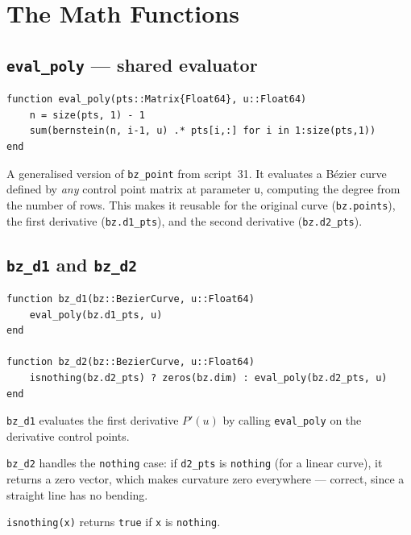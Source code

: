 \documentclass[12pt, a4paper]{article}
\newcommand{\cd}[1]{\texttt{#1}}
\begin{document}
\section{The Math Functions}

\subsection{\texttt{eval\_poly} --- shared evaluator}

\begin{verbatim}
function eval_poly(pts::Matrix{Float64}, u::Float64)
    n = size(pts, 1) - 1
    sum(bernstein(n, i-1, u) .* pts[i,:] for i in 1:size(pts,1))
end
\end{verbatim}

A generalised version of \cd{bz\_point} from script~31.
It evaluates a B\'ezier curve defined by \emph{any}
control point matrix at parameter \cd{u}, computing
the degree from the number of rows.
This makes it reusable for the original curve
(\cd{bz.points}), the first derivative (\cd{bz.d1\_pts}),
and the second derivative (\cd{bz.d2\_pts}).

\subsection{\texttt{bz\_d1} and \texttt{bz\_d2}}

\begin{verbatim}
function bz_d1(bz::BezierCurve, u::Float64)
    eval_poly(bz.d1_pts, u)
end

function bz_d2(bz::BezierCurve, u::Float64)
    isnothing(bz.d2_pts) ? zeros(bz.dim) : eval_poly(bz.d2_pts, u)
end
\end{verbatim}

\cd{bz\_d1} evaluates the first derivative $P'(u)$ by
calling \cd{eval\_poly} on the derivative control points.

\cd{bz\_d2} handles the \cd{nothing} case:
if \cd{d2\_pts} is \cd{nothing} (for a linear curve),
it returns a zero vector, which makes curvature zero
everywhere --- correct, since a straight line has no bending.

\cd{isnothing(x)} returns \cd{true} if \cd{x} is \cd{nothing}.
\end{document}
